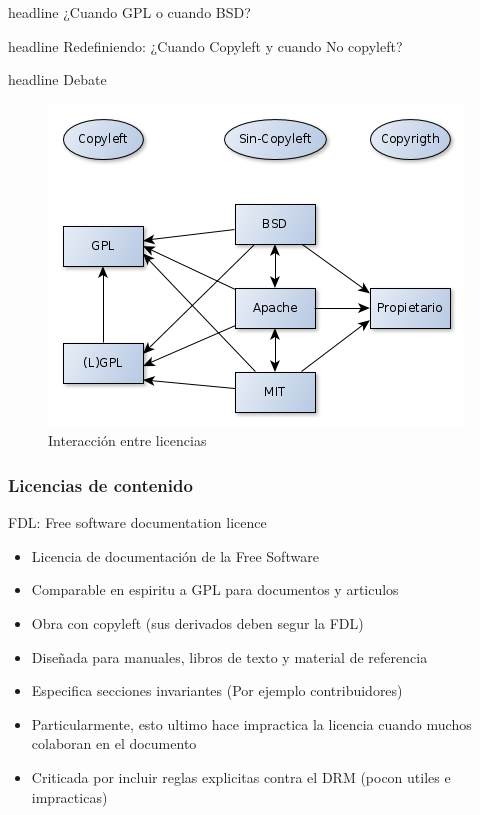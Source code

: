 \documentclass[11pt]{beamer}
\newcommand{\question}[1]
{
\begin{beamercolorbox}[sep=1mm, rounded=true, shadow=true]{headline}
#1
\end{beamercolorbox}
}
\begin{document}
\begin{frame}
\question{¿Cuando GPL o cuando BSD?}
\pause
\question{Redefiniendo: ¿Cuando Copyleft y cuando No copyleft?}
\pause
\question{Debate}
\end{frame}

\begin{frame}
\begin{figure}[hbtp]
\caption{Interacción entre licencias}
\centering
\includegraphics[scale=0.5]{images/lic-diagram.png}
\end{figure}

\end{frame}

\begin{frame}
\frametitle{Licencias de contenido}
\begin{block}{FDL: Free software documentation licence}
\begin{itemize}[<+->]
\item Licencia de documentación de la Free Software
\item Comparable en espiritu a GPL para documentos y articulos
\item Obra con copyleft (sus derivados deben segur la FDL)
\item Diseñada para manuales, libros de texto y material de referencia
\item Especifica secciones invariantes (Por ejemplo contribuidores)
\item Particularmente, esto ultimo hace impractica la licencia cuando muchos colaboran en el documento
\item Criticada por incluir reglas explicitas contra el DRM (pocon utiles e impracticas)
\end{itemize}
\end{block}
\end{frame}
\end{document}
